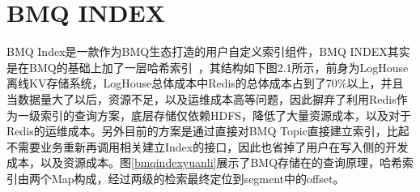 \section{BMQ INDEX} 
BMQ Index是一款作为BMQ生态打造的用户自定义索引组件，BMQ INDEX其实是在BMQ的基础上加了一层哈希索引~\cite{mohsin2011faster}，其结构如下图2.1所示，前身为LogHouse离线KV存储系统，LogHouse总体成本中Redis的总体成本占到了70$\%$以上，并且当数据量大了以后，资源不足，以及运维成本高等问题，因此摒弃了利用Redis作为一级索引的查询方案，底层存储仅依赖HDFS，降低了大量资源成本，以及对于Redis的运维成本。另外目前的方案是通过直接对BMQ Topic直接建立索引，比起不需要业务重新再调用相关建立Index的接口，因此也省掉了用户在写入侧的开发成本，以及资源成本。图\ref{bmqindexyuanli}展示了BMQ存储在的查询原理，哈希索引由两个Map构成，经过两级的检索最终定位到segment中的offset。

